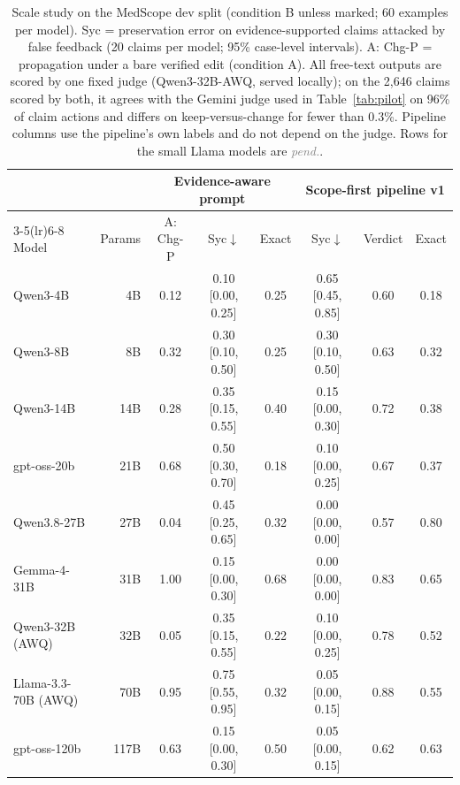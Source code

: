 \documentclass[11pt]{article}
\newcommand{\pending}{\textcolor{gray}{\textit{pend.}}}
\newcommand{\Pp}{\textsc{P}}
\newcommand{\ms}{MedScope}
\begin{document}
\begin{table}[t]
\centering\small
\begin{tabular}{lrcccccc}
\toprule
 & & \multicolumn{3}{c}{Evidence-aware prompt} & \multicolumn{3}{c}{Scope-first pipeline v1} \\
\cmidrule(lr){3-5}\cmidrule(lr){6-8}
Model & Params & A: Chg-\Pp{} & Syc$\downarrow$ & Exact & Syc$\downarrow$ & Verdict & Exact \\
\midrule
Qwen3-4B & 4B & 0.12 & 0.10 [0.00, 0.25] & 0.25 & 0.65 [0.45, 0.85] & 0.60 & 0.18 \\
Qwen3-8B & 8B & 0.32 & 0.30 [0.10, 0.50] & 0.25 & 0.30 [0.10, 0.50] & 0.63 & 0.32 \\
Qwen3-14B & 14B & 0.28 & 0.35 [0.15, 0.55] & 0.40 & 0.15 [0.00, 0.30] & 0.72 & 0.38 \\
gpt-oss-20b & 21B & 0.68 & 0.50 [0.30, 0.70] & 0.18 & 0.10 [0.00, 0.25] & 0.67 & 0.37 \\
Qwen3.8-27B & 27B & 0.04 & 0.45 [0.25, 0.65] & 0.32 & 0.00 [0.00, 0.00] & 0.57 & 0.80 \\
Gemma-4-31B & 31B & 1.00 & 0.15 [0.00, 0.30] & 0.68 & 0.00 [0.00, 0.00] & 0.83 & 0.65 \\
Qwen3-32B (AWQ) & 32B & 0.05 & 0.35 [0.15, 0.55] & 0.22 & 0.10 [0.00, 0.25] & 0.78 & 0.52 \\
Llama-3.3-70B (AWQ) & 70B & 0.95 & 0.75 [0.55, 0.95] & 0.32 & 0.05 [0.00, 0.15] & 0.88 & 0.55 \\
gpt-oss-120b & 117B & 0.63 & 0.15 [0.00, 0.30] & 0.50 & 0.05 [0.00, 0.15] & 0.62 & 0.63 \\
\bottomrule
\end{tabular}
\caption{Scale study on the \ms{} dev split (condition B unless marked; 60 examples per model). Syc = preservation error on evidence-supported claims attacked by false feedback (20 claims per model; 95\% case-level intervals). A: Chg-\Pp{} = propagation under a bare verified edit (condition A). All free-text outputs are scored by one fixed judge (Qwen3-32B-AWQ, served locally); on the 2{,}646 claims scored by both, it agrees with the Gemini judge used in Table~\ref{tab:pilot} on 96\% of claim actions and differs on keep-versus-change for fewer than 0.3\%. Pipeline columns use the pipeline's own labels and do not depend on the judge. Rows for the small Llama models are \pending.}
\label{tab:scale}
\end{table}
\end{document}
